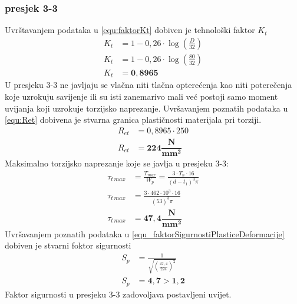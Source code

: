 \documentclass[11pt,a4paper]{report}
\begin{document}
\subsubsection{presjek 3-3}
Uvrštavanjem podataka u \eqref{equ:faktorKt} dobiven je tehnološki faktor $K_t$
\begin{align*}
K_t&=1-0,26\cdot \log \left( \frac{D}{32} \right)\\
K_t&=1-0,26\cdot \log \left( \frac{80}{32} \right)\\
K_t&=\mathbf{0,8965}
\end{align*}
U presjeku 3-3 ne javljaju se vlačna niti tlačna opterećenja kao niti poterečenja koje uzrokuju savijenje ili su isti zanemarivo mali već postoji samo moment uvijanja koji uzrokuje torzijsko naprezanje.
Uvršavanjem poznatih podataka u \eqref{equ:Ret} dobivena je stvarna granica plastičnosti materijala pri torziji.
\begin{align*}
R_{et}&=0,8965 \cdot 250\\
R_{et}&=\mathbf{224 \dfrac{N}{mm^2}}
\end{align*}
Maksimalno torzijsko naprezanje koje se javlja u presjeku 3-3:
\begin{align*}
\tau_{t \, max}&=\frac{T_{max}}{W_p}=\frac{3 \cdot T_n \cdot 16}{(d-t_1)^3 \pi}\\
\tau_{t \, max}&=\frac{3 \cdot 462\cdot 10^3 \cdot 16}{(53)^3 \pi}\\
\tau_{t \, max}&=\mathbf{47,4 \dfrac{N}{mm^2}}
\end{align*}
Uvršavanjem poznatih podataka u \eqref{equ_faktorSigurnostiPlasticeDeformacije} dobiven je stvarni foktor sigurnosti
\begin{align*}
S_p&=\frac{1}{\sqrt{\left(\frac{47,4}{224}\right)^2}}\\
S_p&=\mathbf{4,7 > 1,2}
\end{align*}
Faktor sigurnosti u presjeku 3-3 zadovoljava postavljeni uvijet.
\end{document}
